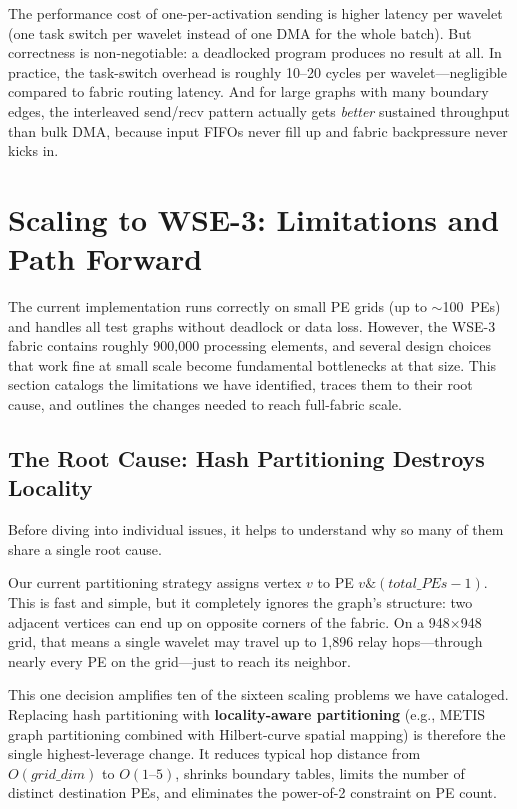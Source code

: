 \documentclass[11pt,letterpaper]{article}
\begin{document}
The performance cost of one-per-activation sending is higher latency per wavelet (one task switch per wavelet instead of one DMA for the whole batch). But correctness is non-negotiable: a deadlocked program produces no result at all. In practice, the task-switch overhead is roughly 10--20 cycles per wavelet---negligible compared to fabric routing latency. And for large graphs with many boundary edges, the interleaved send/recv pattern actually gets \emph{better} sustained throughput than bulk DMA, because input FIFOs never fill up and fabric backpressure never kicks in.

\section{Scaling to WSE-3: Limitations and Path Forward}
\label{sec:scaling}

The current implementation runs correctly on small PE grids (up to $\sim$100~PEs)
and handles all test graphs without deadlock or data loss.
However, the WSE-3 fabric contains roughly 900{,}000 processing elements,
and several design choices that work fine at small scale
become fundamental bottlenecks at that size.
This section catalogs the limitations we have identified,
traces them to their root cause,
and outlines the changes needed to reach full-fabric scale.

\subsection{The Root Cause: Hash Partitioning Destroys Locality}

Before diving into individual issues, it helps to understand
why so many of them share a single root cause.

Our current partitioning strategy assigns vertex $v$ to PE
$v \mathbin{\&} (\mathit{total\_PEs}-1)$.
This is fast and simple, but it completely ignores the graph's structure:
two adjacent vertices can end up on opposite corners of the fabric.
On a 948$\times$948 grid, that means a single wavelet may travel
up to 1{,}896 relay hops---through nearly every PE on the grid---just
to reach its neighbor.

This one decision amplifies ten of the sixteen scaling problems we have cataloged.
Replacing hash partitioning with \textbf{locality-aware partitioning}
(e.g., METIS graph partitioning combined with Hilbert-curve spatial mapping)
is therefore the single highest-leverage change.
It reduces typical hop distance from $O(\mathit{grid\_dim})$ to $O(1\text{--}5)$,
shrinks boundary tables, limits the number of distinct destination PEs,
and eliminates the power-of-2 constraint on PE count.
\end{document}
